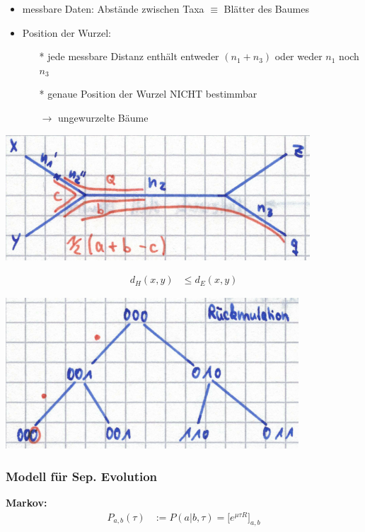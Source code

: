 \begin{itemize}
	\item messbare Daten: Abstände zwischen Taxa $\equiv$ Blätter des Baumes
	\item Position der Wurzel:
		\begin{itemize}
			\item[*] jede messbare Distanz enthält entweder $(n_1 + n_3)$ oder weder $n_1$ noch $n_3$
			\item[*] genaue Position der Wurzel NICHT bestimmbar
			\item[$\rightarrow$] ungewurzelte Bäume
		\end{itemize}
\end{itemize}

\begin{center}
	\includegraphics[scale=0.7]{lectures/161209/pix/ungew_baum}		
\end{center}

\begin{align*}
	d_H (x,y) &\leq d_E (x,y)
\end{align*}

\begin{center}
	\includegraphics[scale=0.7]{lectures/161209/pix/gew_baum}
\end{center}

\newpage	

\subsubsection{Modell für Sep. Evolution}
\textbf{Markov:}
\begin{align*}
	P_{a,b}(\tau) &:= P(a | b, \tau) = \biggl[e^{\mu \tau R} \biggr]_{a,b}
\end{align*}

